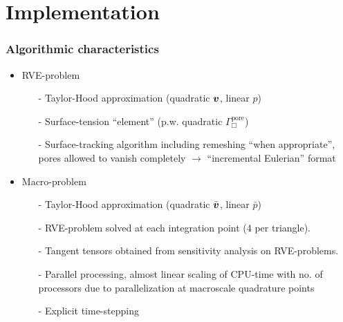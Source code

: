 \documentclass[11pt]{beamer} %
\begin{document}
\section{Implementation}
\begin{frame}
 \frametitle{Algorithmic characteristics}
 \begin{itemize}
  \item RVE-problem
  \begin{itemize}
   \item[-] Taylor-Hood approximation (quadratic $\boldsymbol{v}$, linear $p$)
   \item[-] Surface-tension ``element'' (p.w. quadratic $\Gamma_{\Box}^{\mathrm{pore}}$)
   \item[-] Surface-tracking algorithm including remeshing ``when appropriate'', pores allowed to vanish completely $\longrightarrow$ ``incremental Eulerian'' format
  \end{itemize}
  \item Macro-problem
  \begin{itemize}
   \item[-] Taylor-Hood approximation (quadratic $\bar{\boldsymbol{v}}$, linear $\bar{p}$)
   \item[-] RVE-problem solved at each integration point (4 per triangle).
   \item[-] Tangent tensors obtained from sensitivity analysis on RVE-problems.
   \item[-] Parallel processing,  almost linear scaling of CPU-time with no. of processors due to parallelization at macroscale quadrature points
   \item[-] Explicit time-stepping
  \end{itemize}
 \end{itemize}
\end{frame}
\end{document}
